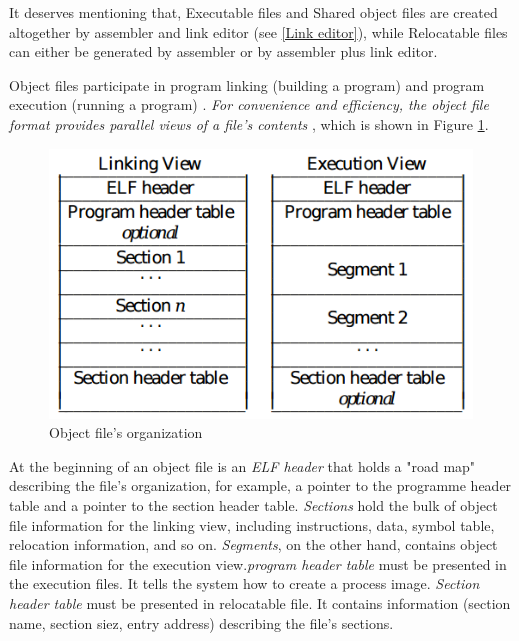           It deserves mentioning that, Executable files and Shared object files are created altogether by assembler and link editor (see \ref{Link editor}), while Relocatable files can either be generated by assembler or by assembler plus link editor\cite{TIS-95}.  
       
        Object files participate in program linking (building a program) and program execution (running a program) \cite{SCO-97}. \textit{For convenience and efficiency, the object file format provides parallel views of a file's contents} \cite{SCO-97}, which is shown in Figure \ref{fig:ELFoverview}. 
        
            \begin{figure}[H]
                \centering
                \includegraphics[scale = 0.4]
                {Images/concepts/ELFoverview.png}
                \caption[Object file's organization]%
                {Object file's organization\cite{SCO-97}}    
                \label{fig:ELFoverview}
            \end{figure}
           
        
            At the beginning of an object file is an \textit{ELF header} that holds a "road map" describing the file's organization, for example, a pointer to the programme header table and a pointer to the section header table. \textit{Sections} hold the bulk of object file information for the linking view, including instructions, data, symbol table, relocation information, and so on\cite{SCO-97}. \textit{Segments}, on the other hand, contains object file information for the execution view.\textit{program header table} must be presented in the execution files. It tells the system how to create a process image\cite{SCO-97}. \textit{Section header table} must be presented in relocatable file. It contains information (section name, section siez, entry address) describing the file's sections. 
            
